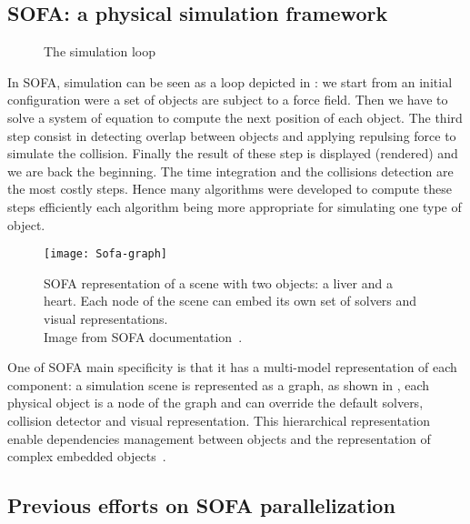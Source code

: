 \subsection{SOFA: a physical simulation framework}

\begin{figure}[htb]
    \centering
    
    \caption[The simulation loop]{The simulation loop}
    \label{fig:simu-pipeline}
\end{figure}

In \gls{SOFA}, simulation can be seen as a loop depicted in : we start from an initial configuration were a set of objects are subject to a force field.
Then we have to solve a system of equation to compute the next position of each object.
The third step consist in detecting overlap between objects and applying repulsing force to simulate the collision.
Finally the result of these step is displayed (rendered) and we are back the beginning.
The time integration and the collisions detection are the most costly steps.
Hence many algorithms  were developed to compute these steps efficiently each algorithm being more appropriate for simulating one type of object.

\begin{figure}[htb]
    \centering
    \texttt{[image: Sofa-graph]}
    \caption[Example of SOFA scene graph]{SOFA representation of a scene with two objects: a liver and a
        heart. Each node of the scene can embed its own set of solvers and
        visual representations.\\
        Image from SOFA documentation~\cite{SOFA16Sofa}.}
    \label{fig:sofa-tree}
\end{figure}

One of \gls{SOFA} main specificity is that it has a multi-model representation of each component: a simulation scene is represented as a graph, as shown in , each physical object is a node of the graph and can override the default solvers, collision detector and visual representation.
This hierarchical representation enable dependencies management between objects and the representation of complex embedded objects~\cite{Nesme09Preserving,Faure11Sparse}.

\subsection{Previous efforts on SOFA parallelization}

